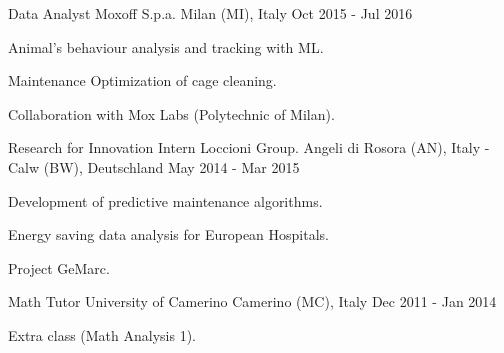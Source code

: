 \begin{cventries}
 \cventry
    {Data Analyst} %
    {Moxoff S.p.a.} %
    {Milan (MI), Italy} %
    {Oct 2015 - Jul 2016} %
    {
     \begin{cvitems} %
        \item {Animal's behaviour analysis and tracking with ML.}
        \item {Maintenance Optimization of cage cleaning.}
        \item {Collaboration with Mox Labs (Polytechnic of Milan).}
      \end{cvitems}
    }

  \cventry
    {Research for Innovation Intern} %
    {Loccioni Group.} %
    {Angeli di Rosora (AN), Italy - Calw (BW), Deutschland} %
    {May 2014 - Mar 2015} %
    {
      \begin{cvitems} %
        \item {Development of predictive maintenance algorithms.}
        \item {Energy saving data analysis for European Hospitals.}
        \item {Project GeMarc.}
      \end{cvitems}
    }

  \cventry
    {Math Tutor} %
    {University of Camerino} %
    {Camerino (MC), Italy} %
    {Dec 2011 - Jan 2014} %
    {
      \begin{cvitems} %
        \item {Extra class (Math Analysis 1).}
       \end{cvitems}
    }

\end{cventries}
